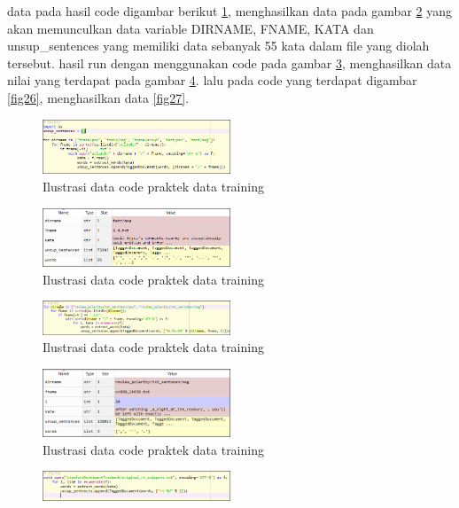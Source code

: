 \begin{enumerate}
data pada hasil code digambar berikut \ref{fig22}, menghasilkan data pada gambar \ref{fig23} yang akan memunculkan data variable DIRNAME, FNAME, KATA dan unsup\_sentences yang memiliki data sebanyak 55 kata dalam file yang diolah tersebut. hasil run dengan menggunakan code pada gambar \ref{fig24}, menghasilkan data nilai yang terdapat pada gambar \ref{fig25}. lalu pada code yang terdapat digambar \ref{fig26}, menghasilkan data \ref{fig27}.
\begin{figure}[!htbp]
	\centering
	\includegraphics[width=0.5\textwidth]{figures/fathi/chapter5/hari3/3}
	\caption{Ilustrasi data code praktek data training }
	\label{fig22}
\end{figure}
\begin{figure}[!htbp]
	\centering
	\includegraphics[width=0.5\textwidth]{figures/fathi/chapter5/hari3/4}
	\caption{Ilustrasi data code praktek data training }
	\label{fig23}
\end{figure}
\begin{figure}[!htbp]
	\centering
	\includegraphics[width=0.5\textwidth]{figures/fathi/chapter5/hari3/5}
	\caption{Ilustrasi data code praktek data training }
	\label{fig24}
\end{figure}
\begin{figure}[!htbp]
	\centering
	\includegraphics[width=0.5\textwidth]{figures/fathi/chapter5/hari3/6}
	\caption{Ilustrasi data code praktek data training }
	\label{fig25}
\end{figure}
\begin{figure}[!htbp]
	\centering
	\includegraphics[width=0.5\textwidth]{figures/fathi/chapter5/hari3/7}

\end{figure}
\end{enumerate}

